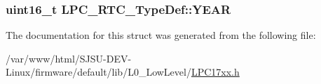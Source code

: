 \subsubsection[{\texorpdfstring{Y\+E\+AR}{YEAR}}]{ uint16\+\_\+t L\+P\+C\+\_\+\+R\+T\+C\+\_\+\+Type\+Def\+::\+Y\+E\+AR}\hypertarget{structLPC__RTC__TypeDef_a335ec6d396bcb052d4eea95c885b2c10}{}\label{structLPC__RTC__TypeDef_a335ec6d396bcb052d4eea95c885b2c10}


The documentation for this struct was generated from the following file\+:\begin{DoxyCompactItemize}
\item 
/var/www/html/\+S\+J\+S\+U-\/\+D\+E\+V-\/\+Linux/firmware/default/lib/\+L0\+\_\+\+Low\+Level/\hyperlink{LPC17xx_8h}{L\+P\+C17xx.\+h}\end{DoxyCompactItemize}
